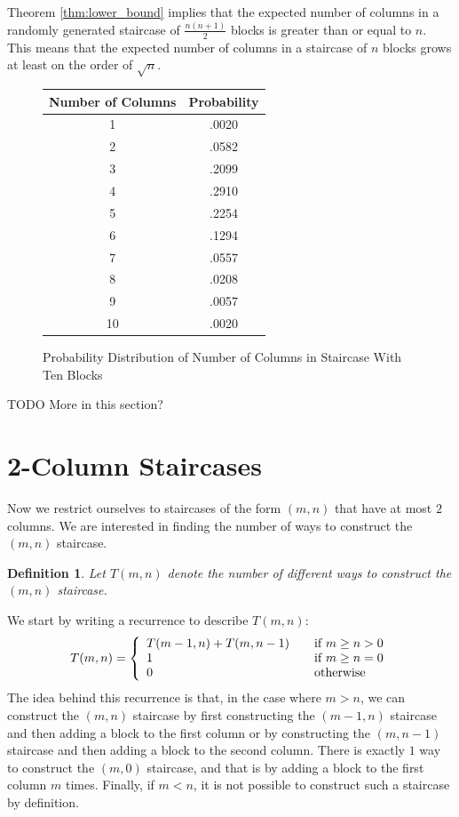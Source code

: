 \documentclass[12pt]{amsart}
\newtheorem{definition}[theorem]{Definition}
\newcommand{\newsection}[2]{
\section{#1 \label{#2}}
}
\begin{document}
Theorem \ref{thm:lower_bound} implies that the expected number of columns in a randomly generated staircase of $\frac{n(n+1)}{2}$ blocks is greater than or equal to $n$. This means that the expected number of columns in a staircase of $n$ blocks grows at least on the order of $\sqrt{n}$.





\begin{figure}
\caption{Probability Distribution of Number of Columns in Staircase With Ten Blocks}
\label{fig:prob_distribution}
\begin{center}
\begin{tabular}{| c | c |}
\hline
Number of Columns & Probability\\ \hline
1 & .0020\\ \hline
2 & .0582\\ \hline
3 & .2099\\ \hline
4 & .2910\\ \hline
5 & .2254\\ \hline
6 & .1294\\ \hline
7 & .0557\\ \hline
8 & .0208\\ \hline
9 & .0057\\ \hline
10 & .0020\\ \hline
\end{tabular}
\end{center}
\end{figure}
  





TODO More in this section?

\newsection{2-Column Staircases}{sec:twocolumn}
Now we restrict ourselves to staircases of the form $(m,n)$ that have at most $2$ columns. We are interested in finding the number of ways to construct the $(m,n)$ staircase.

\begin{definition}
Let $T(m,n)$ denote the number of different ways to construct the $(m,n)$ staircase.
\end{definition}

We start by writing a recurrence to describe $T(m,n)$:
\begin{equation}
T(m,n) = \left\{ 
  \begin{array}{l l}
    T(m-1,n) + T(m,n-1) & \quad \text{if $m \geq n > 0$}\\
    1 & \quad \text{if $m \geq n = 0$}\\
    0 & \quad \text{otherwise}\\
  \end{array} \right.
\label{eqn:2-recurrence}
\end{equation}
The idea behind this recurrence is that, in the case where $m > n$, we can construct the $(m,n)$ staircase by first constructing the $(m-1,n)$ staircase and then adding a block to the first column or by constructing the $(m,n-1)$ staircase and then adding a block to the second column. There is exactly $1$ way to construct the $(m,0)$ staircase, and that is by adding a block to the first column $m$ times. Finally, if $m < n$, it is not possible to construct such a staircase by definition.
\end{document}
